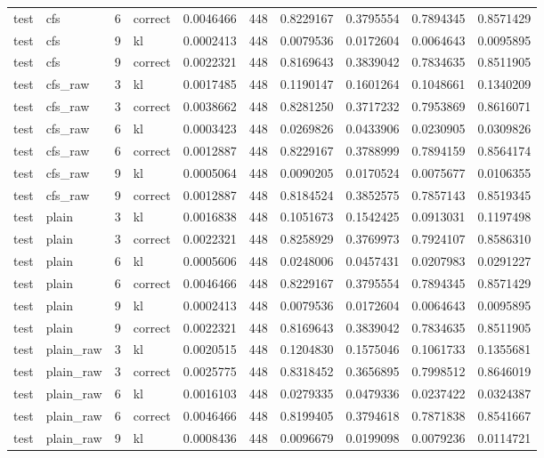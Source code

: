 \begin{tabular}{llrlrrrrrr}
test & cfs & 6 & correct & 0.0046466 & 448 & 0.8229167 & 0.3795554 & 0.7894345 & 0.8571429 \\
test & cfs & 9 & kl & 0.0002413 & 448 & 0.0079536 & 0.0172604 & 0.0064643 & 0.0095895 \\
test & cfs & 9 & correct & 0.0022321 & 448 & 0.8169643 & 0.3839042 & 0.7834635 & 0.8511905 \\
test & cfs_raw & 3 & kl & 0.0017485 & 448 & 0.1190147 & 0.1601264 & 0.1048661 & 0.1340209 \\
test & cfs_raw & 3 & correct & 0.0038662 & 448 & 0.8281250 & 0.3717232 & 0.7953869 & 0.8616071 \\
test & cfs_raw & 6 & kl & 0.0003423 & 448 & 0.0269826 & 0.0433906 & 0.0230905 & 0.0309826 \\
test & cfs_raw & 6 & correct & 0.0012887 & 448 & 0.8229167 & 0.3788999 & 0.7894159 & 0.8564174 \\
test & cfs_raw & 9 & kl & 0.0005064 & 448 & 0.0090205 & 0.0170524 & 0.0075677 & 0.0106355 \\
test & cfs_raw & 9 & correct & 0.0012887 & 448 & 0.8184524 & 0.3852575 & 0.7857143 & 0.8519345 \\
test & plain & 3 & kl & 0.0016838 & 448 & 0.1051673 & 0.1542425 & 0.0913031 & 0.1197498 \\
test & plain & 3 & correct & 0.0022321 & 448 & 0.8258929 & 0.3769973 & 0.7924107 & 0.8586310 \\
test & plain & 6 & kl & 0.0005606 & 448 & 0.0248006 & 0.0457431 & 0.0207983 & 0.0291227 \\
test & plain & 6 & correct & 0.0046466 & 448 & 0.8229167 & 0.3795554 & 0.7894345 & 0.8571429 \\
test & plain & 9 & kl & 0.0002413 & 448 & 0.0079536 & 0.0172604 & 0.0064643 & 0.0095895 \\
test & plain & 9 & correct & 0.0022321 & 448 & 0.8169643 & 0.3839042 & 0.7834635 & 0.8511905 \\
test & plain_raw & 3 & kl & 0.0020515 & 448 & 0.1204830 & 0.1575046 & 0.1061733 & 0.1355681 \\
test & plain_raw & 3 & correct & 0.0025775 & 448 & 0.8318452 & 0.3656895 & 0.7998512 & 0.8646019 \\
test & plain_raw & 6 & kl & 0.0016103 & 448 & 0.0279335 & 0.0479336 & 0.0237422 & 0.0324387 \\
test & plain_raw & 6 & correct & 0.0046466 & 448 & 0.8199405 & 0.3794618 & 0.7871838 & 0.8541667 \\
test & plain_raw & 9 & kl & 0.0008436 & 448 & 0.0096679 & 0.0199098 & 0.0079236 & 0.0114721 \\

\end{tabular}
